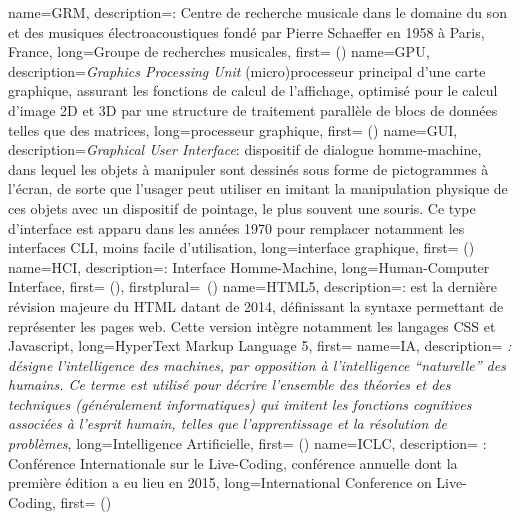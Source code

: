 {
    name={GRM},
    description={\textit{}: Centre de recherche musicale dans le domaine du son et des musiques électroacoustiques fondé par Pierre Schaeffer en 1958 à Paris, France},
    long={Groupe de recherches musicales},
    first={ ()}
}
{
    name={GPU},
    description={\textit{Graphics Processing Unit} (micro)processeur principal d'une carte graphique, assurant les fonctions de calcul de l'affichage, optimisé pour le calcul d'image 2D et 3D par une structure de traitement parallèle de blocs de données telles que des matrices},
    long={processeur graphique},
    first={ ()}
}
{
    name={GUI},
    description={\textit{Graphical User Interface}: dispositif de dialogue homme-machine, dans lequel les objets à manipuler sont dessinés sous forme de pictogrammes à l'écran, de sorte que l'usager peut utiliser en imitant la manipulation physique de ces objets avec un dispositif de pointage, le plus souvent une souris. Ce type d'interface est apparu dans les années 1970 pour remplacer notamment les interfaces \gls{CLI}, moins facile d'utilisation},
    long={interface graphique},
    first={ ()}
}
{
    name={HCI},
    description={\textit{}: Interface Homme-Machine},
    long={Human-Computer Interface},
    first={ ()},
    firstplural={\glspluralsuffix\ (\glspluralsuffix)}
}
{
    name={HTML5},
    description={\textit{}: est la dernière révision majeure du HTML datant de 2014, définissant la syntaxe permettant de représenter les pages web. Cette version intègre notamment les langages CSS et Javascript},
    long={HyperText Markup Language 5},
    first={}
}
{
    name={IA},
    description={\textit{ : désigne l'intelligence des machines, par opposition à l'intelligence ``naturelle'' des humains. Ce terme est utilisé pour décrire l'ensemble des théories et des techniques (généralement informatiques) qui imitent les fonctions cognitives associées à l'esprit humain, telles que l'apprentissage et la résolution de problèmes}},
    long={Intelligence Artificielle},
    first={ ()}
}
{
    name={ICLC},
    description={\textit{} : Conférence Internationale sur le Live-Coding, conférence annuelle dont la première édition a eu lieu en 2015},
    long={International Conference on Live-Coding},
    first={ ()}
}
